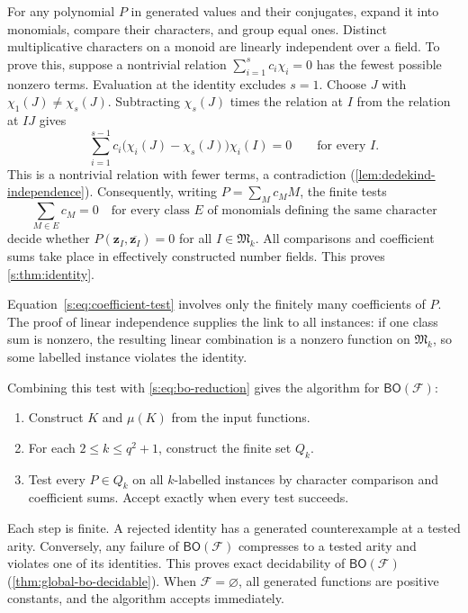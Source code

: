 \documentclass[11pt,letterpaper,onecolumn]{article}
\theoremstyle{plain}
\theoremstyle{definition}
\theoremstyle{remark}
\newcommand{\cF}{\mathcal F}
\newcommand{\BO}{\mathsf{BO}}
\begin{document}
For any polynomial $P$ in generated values and their conjugates, expand
it into monomials, compare their characters, and group equal ones.
Distinct multiplicative characters on a monoid are linearly independent
over a field. To prove this, suppose a nontrivial relation
$\sum_{i=1}^s c_i\chi_i=0$ has the fewest possible nonzero terms.
Evaluation at the identity excludes $s=1$. Choose $J$ with
$\chi_1(J)\ne\chi_s(J)$. Subtracting $\chi_s(J)$ times the relation
at $I$ from the relation at $IJ$ gives
\[
 \sum_{i=1}^{s-1}c_i\bigl(\chi_i(J)-\chi_s(J)\bigr)\chi_i(I)=0
 \qquad\text{for every }I.
\]
This is a nontrivial relation with fewer terms, a contradiction
(\cref{lem:dedekind-independence}).
Consequently, writing $P=\sum_M c_MM$, the finite tests
\begin{equation}
 \sum_{M\in E}c_M=0
 \quad\text{for every class }E\text{ of monomials defining the same character}
 \label{s:eq:coefficient-test}
\end{equation}
decide
whether $P(\mathbf z_I,\overline{\mathbf z_I})=0$ for all
$I\in\mathfrak M_k$. All comparisons and coefficient sums take place
in effectively constructed number fields. This proves
\cref{s:thm:identity}.

Equation~\eqref{s:eq:coefficient-test} involves only the finitely many coefficients
of $P$. The proof of linear independence supplies the link to all
instances: if one class sum is nonzero, the resulting linear combination
is a nonzero function on $\mathfrak M_k$, so some labelled instance
violates the identity.

Combining this test with \eqref{s:eq:bo-reduction} gives the algorithm
for $\BO(\cF)$:
\begin{enumerate}
 \item Construct $K$ and $\mu(K)$ from the input functions.
 \item For each $2\le k\le q^2+1$, construct the finite set $Q_k$.
 \item Test every $P\in Q_k$ on all $k$-labelled instances by character
       comparison and coefficient sums. Accept exactly when every test succeeds.
\end{enumerate}
Each step is finite. A rejected identity has a generated counterexample
at a tested arity. Conversely, any failure of $\BO(\cF)$ compresses
to a tested arity and violates one of its identities. This proves exact
decidability of $\BO(\cF)$ (\cref{thm:global-bo-decidable}).
When $\cF=\varnothing$, all generated functions are positive constants,
and the algorithm accepts immediately.
\end{document}
